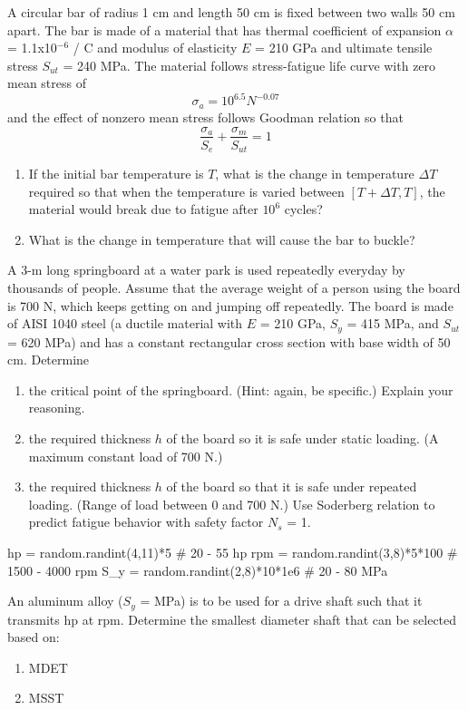 \documentclass[
10pt,
a4paper,
openany,
svgnames,
]{kaobook} %
\begin{document}
\begin{exercises}
  \item A circular bar of radius 1 cm and length 50 cm is fixed between two walls 50 cm apart. The bar is made of a material that has thermal coefficient of expansion $\alpha$ = 1.1x10$^{-6}$ / C and modulus of elasticity $E$ = 210 GPa and ultimate tensile stress $S_{ut}$ = 240 MPa. The material follows stress-fatigue life curve with zero mean stress of
  \[ \sigma_a = 10^{6.5}N^{-0.07} \]
  and the effect of nonzero mean stress follows Goodman relation so that
  \[ \frac{\sigma_a}{S_e} + \frac{\sigma_m}{S_{ut}} = 1 \]
  \begin{enumerate}
  \item If the initial bar temperature is $T$, what is the change in temperature $\Delta T$ required so that when the temperature is varied between $[T+\Delta T, T]$, the material would break due to fatigue after $10^6$ cycles?
  \item What is the change in temperature that will cause the bar to buckle?
  \end{enumerate}

  \item A 3-m long springboard at a water park is used repeatedly everyday by thousands of people. Assume that the average weight of a person using the board is 700 N, which keeps getting on and jumping off repeatedly. The board is made of AISI 1040 steel (a ductile material with $E$ = 210 GPa, $S_y$ = 415 MPa, and
  $S_{ut}$ = 620 MPa) and has a constant rectangular cross section with base width of 50 cm. Determine
  \begin{enumerate}
  \item the critical point of the springboard. (Hint: again, be specific.) Explain your reasoning.
  \item the required thickness $h$ of the board so it is safe under static loading. (A maximum constant load of 700 N.)
  \item the required thickness $h$ of the board so that it is safe under repeated loading. (Range of load between 0 and 700 N.) Use Soderberg relation to predict fatigue behavior with safety factor
    $N_s$ = 1.
  \end{enumerate}

\begin{pycode}
hp = random.randint(4,11)*5 # 20 - 55 hp
rpm = random.randint(3,8)*5*100 # 1500 - 4000 rpm
S_y = random.randint(2,8)*10*1e6 # 20 - 80 MPa
\end{pycode}

  \item An aluminum alloy ($S_{y}$ =  MPa) is to be used for a drive shaft such that it transmits  hp at  rpm. Determine the smallest diameter shaft that can be selected based on:
        \begin{enumerate}
          \item MDET
          \item MSST
        \end{enumerate}


\end{exercises}
\end{document}
